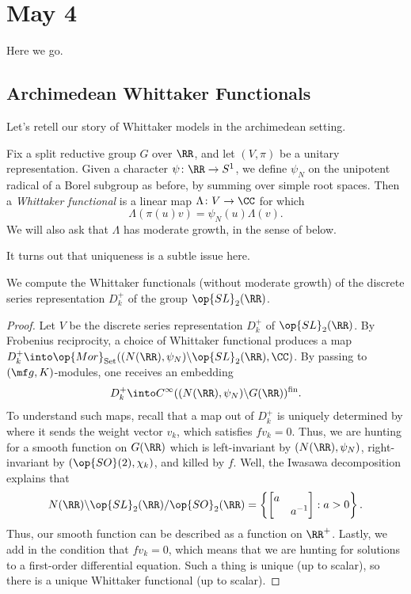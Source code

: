 \documentclass[../notes.tex]{subfiles}
\begin{document}
\section{May 4}
Here we go.

\subsection{Archimedean Whittaker Functionals}
Let's retell our story of Whittaker models in the archimedean setting.
\begin{definition}
	Fix a split reductive group $G$ over $\RR$, and let $(V,\pi)$ be a unitary representation. Given a character $\psi\colon\RR\to S^1$, we define $\psi_N$ on the unipotent radical of a Borel subgroup as before, by summing over simple root spaces. Then a \textit{Whittaker functional} is a linear map $\Lambda\colon V\to\CC$ for which
	\[\Lambda(\pi(u)v)=\psi_N(u)\Lambda(v).\]
	We will also ask that $\Lambda$ has moderate growth, in the sense of  below.
\end{definition}
It turns out that uniqueness is a subtle issue here.
\begin{exe}
	We compute the Whittaker functionals (without moderate growth) of the discrete series representation $D_k^+$ of the group $\op{SL}_2(\RR)$.
\end{exe}
\begin{proof}
	Let $V$ be the discrete series representation $D_k^+$ of $\op{SL}_2(\RR)$. By Frobenius reciprocity, a choice of Whittaker functional produces a map $D_k^+\into\op{Mor}_{\mathrm{Set}}((N(\RR),\psi_N)\backslash\op{SL}_2(\RR),\CC)$. By passing to $(\mf g,K)$-modules, one receives an embedding
	\[D_k^+\into C^\infty((N(\RR),\psi_N)\backslash G(\RR))^{\mathrm{fin}}.\]
	To understand such maps, recall that a map out of $D_k^+$ is uniquely determined by where it sends the weight vector $v_k$, which satisfies $fv_k=0$. Thus, we are hunting for a smooth function on $G(\RR)$ which is left-invariant by $(N(\RR),\psi_N)$, right-invariant by $(\op{SO}(2),\chi_k)$, and killed by $f$. Well, the Iwasawa decomposition explains that
	\[N(\RR)\backslash\op{SL}_2(\RR)/\op{SO}_2(\RR)=\left\{\begin{bmatrix}
		a \\ & a^{-1}
	\end{bmatrix}:a>0\right\}.\]
	Thus, our smooth function can be described as a function on $\RR^+$. Lastly, we add in the condition that $fv_k=0$, which means that we are hunting for solutions to a first-order differential equation. Such a thing is unique (up to scalar), so there is a unique Whittaker functional (up to scalar).
\end{proof}
\end{document}

